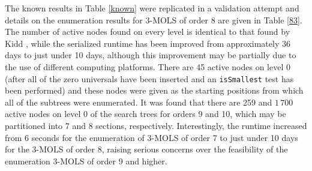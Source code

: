 \documentclass[11pt, a4paper]{article}
\newcommand{\iis}{\texttt{isSmallest} }
\newcounter{ls}
\begin{document}
The known results in Table \ref{known} were replicated in a validation attempt and details on the enumeration results for $3$-MOLS of order 8 are given in Table \ref{83}. The number of active nodes found  on every level is identical to that found by Kidd \cite{Kidd2012}%
, while the serialized runtime has been improved from approximately 36 days to just under 10 days, although this improvement may be partially due to the use of different computing platforms. There are 45 active nodes on level 0 (after all of the zero universals have been inserted  and an \iis test has been performed) and these nodes were given as the starting positions from which all of the subtrees were enumerated. It was found that there are 259 and $1\,700$ active nodes on level 0 of the search trees for orders 9 and 10, which may be partitioned into 7 and 8 sections, respectively. Interestingly, the runtime increased from 6 seconds for the enumeration of $3$-MOLS of order 7 to just under 10 days for the $3$-MOLS of order  8, raising serious concerns over the feasibility of the enumeration $3$-MOLS of order 9 and higher. 
\end{document}
